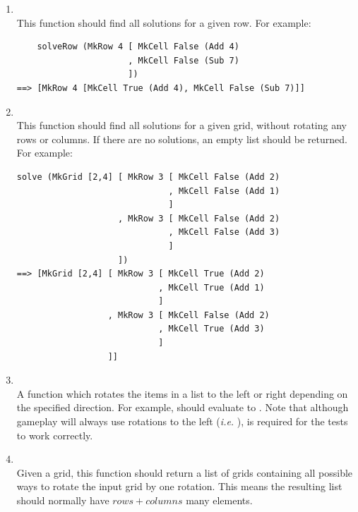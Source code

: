 \begin{enumerate}
	\item {}\\
	This function should find all solutions for a given row. For example:
\begin{verbatim}
    solveRow (MkRow 4 [ MkCell False (Add 4)
                      , MkCell False (Sub 7)
                      ])
==> [MkRow 4 [MkCell True (Add 4), MkCell False (Sub 7)]]
\end{verbatim}
	
	\item {}\\
	This function should find all solutions for a given grid, without rotating any rows or columns. If there are no solutions, an empty list should be returned. For example:
\begin{verbatim}
solve (MkGrid [2,4] [ MkRow 3 [ MkCell False (Add 2)
                              , MkCell False (Add 1)
                              ]
                    , MkRow 3 [ MkCell False (Add 2)
                              , MkCell False (Add 3)
                              ]
                    ])
==> [MkGrid [2,4] [ MkRow 3 [ MkCell True (Add 2)
                            , MkCell True (Add 1)
                            ]
                  , MkRow 3 [ MkCell False (Add 2)
                            , MkCell True (Add 3)
                            ]
                  ]]
\end{verbatim}

	\item {}\\
	A function which rotates the items in a list to the left or right depending on the specified direction. For example,  should evaluate to \haskellIn{[2,3,1]}. Note that although gameplay will always use rotations to the left (\emph{i.e.} ),  is required for the tests to work correctly.
	
	\item {}\\
	Given a grid, this function should return a list of grids containing all possible ways to rotate the input grid by one rotation. This means the resulting list should normally have $\mathit{rows} + \mathit{columns}$ many elements.
	

\end{enumerate}
